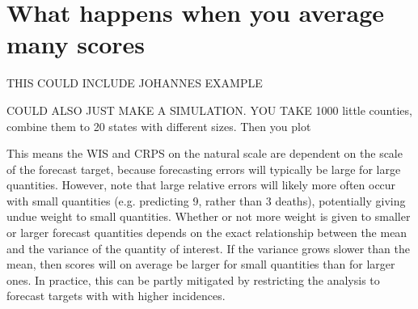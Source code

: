 \documentclass{article}
\begin{document}
\section{What happens when you average many scores}

THIS COULD INCLUDE JOHANNES EXAMPLE

COULD ALSO JUST MAKE A SIMULATION. 
YOU TAKE 1000 little counties, combine them to 20 states with different sizes. Then you plot 


This means the WIS and CRPS on the natural scale are dependent on the scale of the forecast target, because forecasting errors will typically be large for large quantities. 
However, note that large relative errors will likely more often occur with small quantities (e.g. predicting 9, rather than 3 deaths), potentially giving undue weight to small quantities. Whether or not more weight is given to smaller or larger forecast quantities depends on the exact relationship between the mean and the variance of the quantity of interest. If the variance grows slower than the mean, then scores will on average be larger for small quantities than for larger ones. In practice, this can be partly mitigated by restricting the analysis to forecast targets with with higher incidences. 





\end{document}
